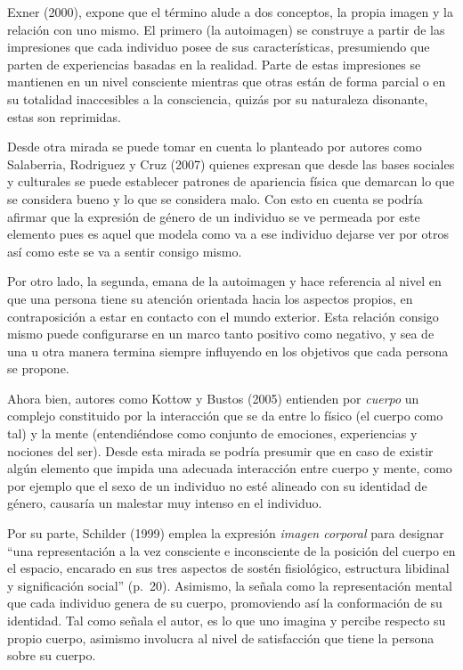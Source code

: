 Exner (2000), expone que el término alude a dos conceptos, la propia imagen y la
relación con uno mismo.
El primero (la autoimagen) se construye a partir de las impresiones que cada
individuo posee de sus características, presumiendo que parten de experiencias
basadas en la realidad.
Parte de estas impresiones se mantienen en un nivel consciente mientras que
otras están de forma parcial o en su totalidad inaccesibles a la consciencia,
quizás por su naturaleza disonante, estas son reprimidas.

Desde otra mirada se puede tomar en cuenta lo planteado por autores como
Salaberria, Rodriguez y Cruz (2007) quienes expresan que desde las bases
sociales y culturales se puede establecer patrones de apariencia física que
demarcan lo que se considera bueno y lo que se considera malo.
Con esto en cuenta se podría afirmar que la expresión de género de un individuo
se ve permeada por este elemento pues es aquel que modela como va a ese
individuo dejarse ver por otros así como este se va a sentir consigo mismo.

Por otro lado, la segunda, emana de la autoimagen y hace referencia al nivel en
que una persona tiene su atención orientada hacia los aspectos propios, en
contraposición a estar en contacto con el mundo exterior.
Esta relación consigo mismo puede configurarse en un marco tanto positivo como
negativo, y sea de una u otra manera termina siempre influyendo en los objetivos
que cada persona se propone.

Ahora bien, autores como Kottow y Bustos (2005) entienden por \emph{cuerpo}  un
complejo constituido por la interacción que se da entre lo físico (el cuerpo
como tal) y la mente (entendiéndose como conjunto de emociones, experiencias y
nociones del ser).
Desde esta mirada se podría presumir que en caso de existir algún elemento que
impida una adecuada interacción entre cuerpo y mente, como por ejemplo que el
sexo de un individuo no esté alineado con su identidad de género, causaría un
malestar muy intenso en el individuo.

Por su parte, Schilder (1999) emplea la expresión \emph{imagen corporal} para designar
“una representación a la vez consciente e inconsciente de la posición del cuerpo
en el espacio, encarado en sus tres aspectos de sostén fisiológico, estructura
libidinal y significación social” (p.~20).
Asimismo, la señala como la representación  mental que cada individuo genera de
su cuerpo, promoviendo así la conformación de su identidad.
Tal como señala el autor, es lo que uno imagina y percibe respecto su propio
cuerpo, asimismo involucra al nivel de satisfacción que tiene la persona sobre
su cuerpo.

